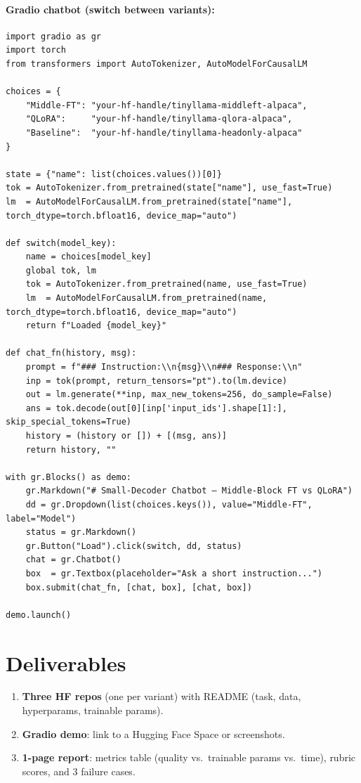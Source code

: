 \documentclass[11pt]{article}
\begin{document}
\paragraph{Gradio chatbot (switch between variants):}
\begin{lstlisting}[style=py]
import gradio as gr
import torch
from transformers import AutoTokenizer, AutoModelForCausalLM

choices = {
    "Middle-FT": "your-hf-handle/tinyllama-middleft-alpaca",
    "QLoRA":     "your-hf-handle/tinyllama-qlora-alpaca",
    "Baseline":  "your-hf-handle/tinyllama-headonly-alpaca"
}

state = {"name": list(choices.values())[0]}
tok = AutoTokenizer.from_pretrained(state["name"], use_fast=True)
lm  = AutoModelForCausalLM.from_pretrained(state["name"], torch_dtype=torch.bfloat16, device_map="auto")

def switch(model_key):
    name = choices[model_key]
    global tok, lm
    tok = AutoTokenizer.from_pretrained(name, use_fast=True)
    lm  = AutoModelForCausalLM.from_pretrained(name, torch_dtype=torch.bfloat16, device_map="auto")
    return f"Loaded {model_key}"

def chat_fn(history, msg):
    prompt = f"### Instruction:\\n{msg}\\n### Response:\\n"
    inp = tok(prompt, return_tensors="pt").to(lm.device)
    out = lm.generate(**inp, max_new_tokens=256, do_sample=False)
    ans = tok.decode(out[0][inp['input_ids'].shape[1]:], skip_special_tokens=True)
    history = (history or []) + [(msg, ans)]
    return history, ""

with gr.Blocks() as demo:
    gr.Markdown("# Small-Decoder Chatbot — Middle-Block FT vs QLoRA")
    dd = gr.Dropdown(list(choices.keys()), value="Middle-FT", label="Model")
    status = gr.Markdown()
    gr.Button("Load").click(switch, dd, status)
    chat = gr.Chatbot()
    box  = gr.Textbox(placeholder="Ask a short instruction...")
    box.submit(chat_fn, [chat, box], [chat, box])

demo.launch()
\end{lstlisting}

\section*{Deliverables}
\begin{enumerate}[label=\arabic*.]
  \item \textbf{Three HF repos} (one per variant) with README (task, data, hyperparams, trainable params).
  \item \textbf{Gradio demo}: link to a Hugging Face Space or screenshots.
  \item \textbf{1-page report}: metrics table (quality vs.\ trainable params vs.\ time), rubric scores, and 3 failure cases.
\end{enumerate}
\end{document}
